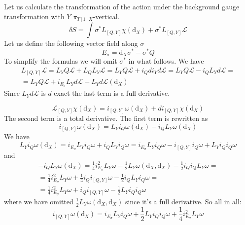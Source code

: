 \documentclass[a4paper,12pt]{article}
\numberwithin{equation}{section} %
\newcommand{\dx}{\mathrm{d}_X}
\def\cL{\mathcal{L}}
\begin{document}
Let us calculate the transformation of the action under the background gauge transformation with $Y$  $\pi_{T[1]X}$-vertical. 
\begin{equation}
    \delta S = \int \sigma^* L_{[Q,Y]}\chi (\dx) + \sigma^*L_{[Q,Y]}\cL
\end{equation}
Let us define the following vector field along $\sigma$
\begin{equation}
    E_\sigma = \dx\sigma^* - \sigma^*Q
\end{equation}
To simplify the formulas we will omit $\sigma^*$ in what follows. We have 
\begin{equation}
\begin{gathered}
    L_{[Q,Y]}\cL = L_Y Q\cL + L_QL_Y\cL = L_Y Q\cL + i_Q d i_Y d\cL = L_Y Q\cL - i_Q L_Y  d\cL = \\ = L_Y Q\cL + i_{E_\sigma} L_Y  d\cL - L_Y  d\cL(\dx)
\end{gathered}
\end{equation}
Since $L_Y  d\cL$ is $d$ exact the last term is a full derivative.

\begin{equation}
    \cL_{[Q,Y]} \chi (\dx) = i_{[Q,Y]} \omega (\dx) + di_{[Q,Y]} \chi (\dx)
\end{equation}
The second term is a total derivative. The first term is rewritten as 
\begin{equation}
    i_{[Q,Y]} \omega(\dx) = L_Y i_Q\omega (\dx) - i_Q L_Y \omega (\dx)
\end{equation}
We have 
\begin{equation}
    L_Y i_Q\omega (\dx) = i_{E_\sigma} L_Y i_Q\omega + i_Q L_Y i_Q\omega = i_{E_\sigma} L_Y i_Q\omega - i_{[Q,Y]}i_Q\omega + L_Yi_Q i_Q \omega
\end{equation}
and
\begin{equation}
\begin{gathered}
    - i_Q L_Y \omega (\dx) = \frac{1}{4}i^2_{E_\sigma} L_Y \omega - \frac{1}{2}L_Y\omega (\dx,\dx) - \frac{1}{2}i_Q i_Q L_Y\omega = \\ = \frac{1}{4}i^2_{E_\sigma} L_Y \omega  + \frac{1}{4}i_Q i_{[Q,Y]} \omega - \frac{1}{2}i_Q L_Yi_Q \omega = \\ = \frac{1}{4}i^2_{E_\sigma} L_Y \omega +  i_Q i_{[Q,Y]} \omega - \frac{1}{2}L_Yi_Q i_Q \omega 
\end{gathered}
\end{equation}
where we have omitted $\frac{1}{2}L_Y\omega (\dx,\dx)$ since it's a full derivative. So all in all:
\begin{equation}
    i_{[Q,Y]} \omega (\dx) = i_{E_\sigma} L_Y i_Q\omega + \frac{1}{2}L_Yi_Q i_Q \omega + \frac{1}{4}i^2_{E_\sigma} L_Y \omega
\end{equation}
\end{document}
